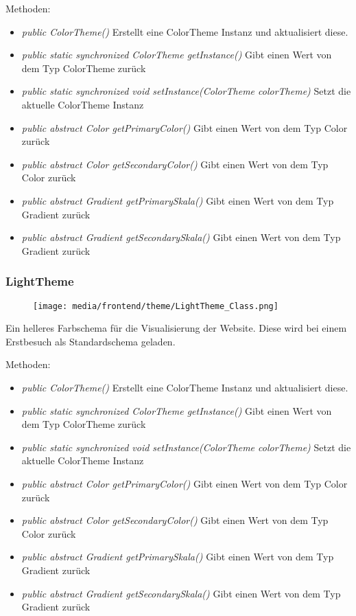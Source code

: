 \begin{itemize}
Methoden:
\begin{itemize} 
    \item \emph{public ColorTheme()} Erstellt eine ColorTheme Instanz und aktualisiert diese.
    \item \emph{public static synchronized ColorTheme getInstance()} Gibt einen Wert von dem Typ ColorTheme zurück
    \item \emph{public static synchronized void setInstance(ColorTheme colorTheme)} Setzt die aktuelle ColorTheme Instanz
    \item \emph{public abstract Color getPrimaryColor()} Gibt einen Wert von dem Typ Color zurück
    \item \emph{public abstract Color getSecondaryColor()} Gibt einen Wert von dem Typ Color zurück
    \item \emph{public abstract Gradient getPrimarySkala()} Gibt einen Wert von dem Typ Gradient zurück
    \item \emph{public abstract Gradient getSecondarySkala()}  Gibt einen Wert von dem Typ Gradient zurück
\end{itemize}

\subsubsection{LightTheme}

\begin{minipage}{0.3\textwidth}
    \begin{figure}[H]
        \texttt{[image: media/frontend/theme/LightTheme\_Class.png]}
    \end{figure}
    \end{minipage} \hfill
    \begin{minipage}{0.6\textwidth}
        Ein helleres Farbschema für die Visualisierung der Website. Diese wird bei einem Erstbesuch als Standardschema geladen.
    \end{minipage}

Methoden:
\begin{itemize} 
    \item \emph{public ColorTheme()} Erstellt eine ColorTheme Instanz und aktualisiert diese.
    \item \emph{public static synchronized ColorTheme getInstance()} Gibt einen Wert von dem Typ ColorTheme zurück
    \item \emph{public static synchronized void setInstance(ColorTheme colorTheme)} Setzt die aktuelle ColorTheme Instanz
    \item \emph{public abstract Color getPrimaryColor()} Gibt einen Wert von dem Typ Color zurück
    \item \emph{public abstract Color getSecondaryColor()} Gibt einen Wert von dem Typ Color zurück
    \item \emph{public abstract Gradient getPrimarySkala()} Gibt einen Wert von dem Typ Gradient zurück
    \item \emph{public abstract Gradient getSecondarySkala()}  Gibt einen Wert von dem Typ Gradient zurück
\end{itemize}


\end{itemize}
